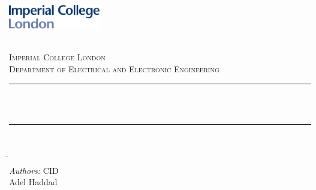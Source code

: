 \begin{titlepage}

\newcommand{\HRule}{\rule{\linewidth}{0.5mm}} %



\includegraphics[width = 4cm, keepaspectratio]{imperial.pdf}\\
\vspace{0.25cm}

\begin{center} %

\textsc{\LARGE \reporttype}\\[0.5cm] 
\textsc{\Large Imperial College London}\\[0.25cm] 
\textsc{\large Department of Electrical and Electronic Engineering}\\[0.5cm] 

\HRule \\[0.4cm]
{ \huge \bfseries \reporttitle}\\ %
\HRule \\[1.5cm]
\end{center}


\begin{flushleft} \large

\begin{tabbing} 
\hspace{55mm} \= \hspace{10pt} \=\\
\textit{Authors:} \> \> {CID}\\
\hspace{2mm} Adel Haddad		 \\
\end{tabbing} 


\end{flushleft}
\end{titlepage}
